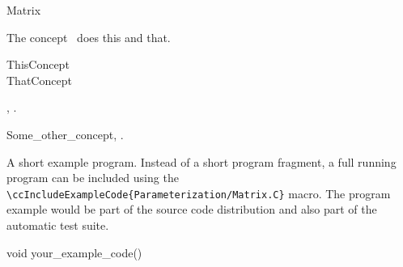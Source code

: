 

\begin{ccRefConcept}[SparseLinearAlgebra_d::]{Matrix}


\ccDefinition

The concept \ccRefName\ does this and that.

\ccGeneralizes

ThisConcept \\
ThatConcept

\ccTypes


\ccCreation
{}  %


\ccOperations


\ccHasModels

,
.

\ccSeeAlso

Some\_other\_concept,
.

\ccExample

A short example program.
Instead of a short program fragment, a full running program can be
included using the
\verb|\ccIncludeExampleCode{Parameterization/Matrix.C}|
macro. The program example would be part of the source code distribution and
also part of the automatic test suite.

\begin{ccExampleCode}
void your_example_code() {
}
\end{ccExampleCode}


\end{ccRefConcept}


